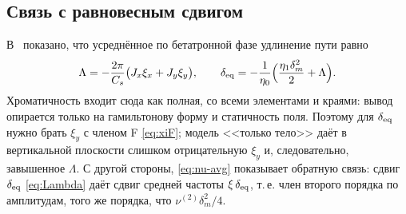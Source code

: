 \subsection{Связь с равновесным сдвигом}

В~\cite{EqNote} показано, что усреднённое по бетатронной фазе удлинение пути равно
\begin{equation}
\label{eq:Lambda}
\Lambda=-\frac{2\pi}{C_s}\bigl(J_x\xi_x+J_y\xi_y\bigr),
\qquad
\delta_{\mathrm{eq}}=-\frac{1}{\eta_0}\Bigl(\frac{\eta_1\delta_m^2}{2}+\Lambda\Bigr).
\end{equation}
Хроматичность входит сюда как полная, со всеми элементами и краями: вывод~\cite{EqNote} опирается только на гамильтонову форму и статичность поля. Поэтому для $\delta_{\mathrm{eq}}$ нужно брать $\xi_y$ с членом F \eqref{eq:xiF}; модель <<только тело>> даёт в вертикальной плоскости слишком отрицательную $\xi_y$ и, следовательно, завышенное $\Lambda$. С другой стороны, \eqref{eq:nu-avg} показывает обратную связь: сдвиг $\delta_{\mathrm{eq}}$ \eqref{eq:Lambda} даёт сдвиг средней частоты $\xi\,\delta_{\mathrm{eq}}$, т.\,е. член второго порядка по амплитудам, того же порядка, что $\nu^{(2)}\delta_m^2/4$.
